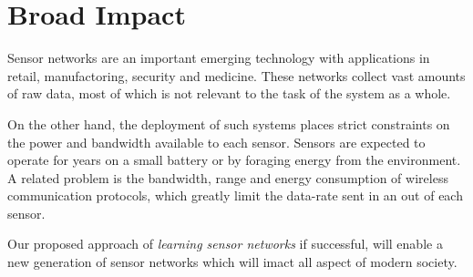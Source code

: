 \section{Broad Impact}
Sensor networks are an important emerging technology with applications
in retail, manufactoring, security and medicine. These networks
collect vast amounts of raw data, most of which is not relevant to the
task of the system as a whole.

On the other hand, the deployment of such systems places strict
constraints on the power and bandwidth available to each sensor.
Sensors are expected to operate for years on a small battery or by
foraging energy from the environment. A related problem is the
bandwidth, range and energy consumption of wireless communication
protocols, which greatly limit the data-rate sent in an out of each
sensor.
 
Our proposed approach of {\em learning sensor networks} if successful,
will enable a new generation of sensor networks which will imact all
aspect of modern society.



